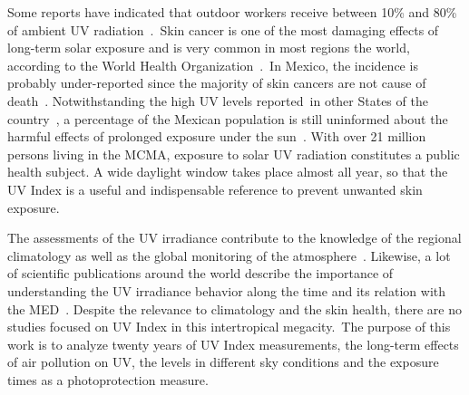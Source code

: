 \documentclass{article}
\begin{document}
{%
{Some reports have indicated that outdoor workers receive between 10\%
and 80\% of ambient UV radiation~}\cite{Larko1983,Makgabutlane_2015,Silva_2016,Moldovan_2020}{.~}Skin cancer is
one of the most damaging effects of long-term solar exposure and is very
common in most regions the world, according to the World Health
Organization~\cite{2002}.~In Mexico, the incidence is probably
under-reported since the majority of skin cancers are not cause of
death~\cite{jm2011}. Notwithstanding the high UV levels reported~in
other States of the country~\cite{moscoso2012}, a percentage of the
Mexican population is still uninformed about the harmful effects of
prolonged exposure under the sun~\cite{b2006}.{ With over 21
million persons living in the MCMA, exposure to solar UV radiation
constitutes a public health subject. A wide daylight window takes place
almost all year, so that the UV Index is a useful and indispensable
reference to prevent unwanted skin exposure.~ }

{The assessments of the UV irradiance contribute to the knowledge of the
regional climatology as well as the global monitoring of the
atmosphere~}\cite{Madronich_1993,Fioletov_2004,Staiger_2005,Luccini_2006,Herman_2010,Bech_2014,Utrillas_2018}{. Likewise, a lot of scientific
publications around the world describe the importance of understanding
the UV irradiance behavior along the time and its relation with the
MED~}\cite{Calaf_2011,RIVAS_2015,Lehmann_2019,Parra_2019,Cadet_2019}{. Despite the relevance to climatology and the
skin health, there are no studies focused on UV Index in this
intertropical megacity.~The purpose of this work is to analyze twenty
years of UV Index measurements, the long-term effects of air pollution
on UV, the levels in different sky conditions and the exposure times as
a photoprotection measure.}

}
\end{document}
